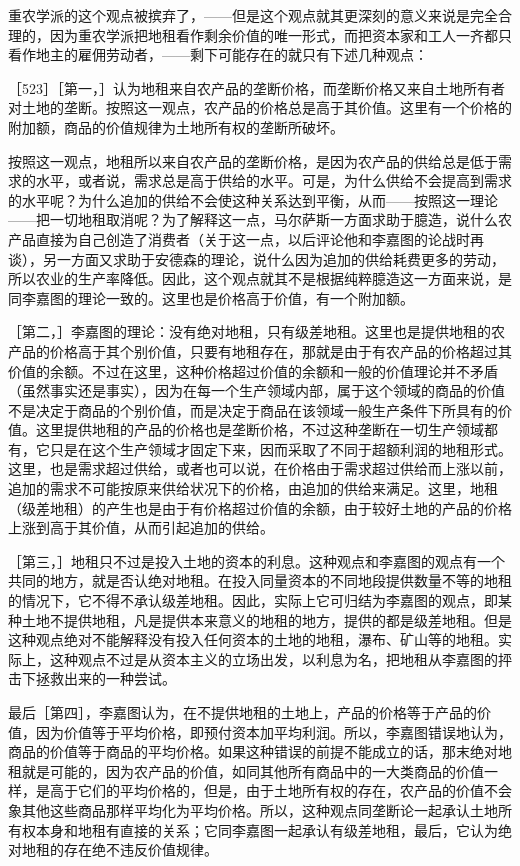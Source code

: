 重农学派的这个观点被摈弃了，——但是这个观点就其更深刻的意义来说是完全合理的，因为重农学派把地租看作剩余价值的唯一形式，而把资本家和工人一齐都只看作地主的雇佣劳动者，——剩下可能存在的就只有下述几种观点：

［523］［第一，］认为地租来自农产品的垄断价格，而垄断价格又来自土地所有者对土地的垄断。按照这一观点，农产品的价格总是高于其价值。这里有一个价格的附加额，商品的价值规律为土地所有权的垄断所破坏。

按照这一观点，地租所以来自农产品的垄断价格，是因为农产品的供给总是低于需求的水平，或者说，需求总是高于供给的水平。可是，为什么供给不会提高到需求的水平呢？为什么追加的供给不会使这种关系达到平衡，从而——按照这一理论——把一切地租取消呢？为了解释这一点，马尔萨斯一方面求助于臆造，说什么农产品直接为自己创造了消费者（关于这一点，以后评论他和李嘉图的论战时再谈），另一方面又求助于安德森的理论，说什么因为追加的供给耗费更多的劳动，所以农业的生产率降低。因此，这个观点就其不是根据纯粹臆造这一方面来说，是同李嘉图的理论一致的。这里也是价格高于价值，有一个附加额。

［第二，］李嘉图的理论：没有绝对地租，只有级差地租。这里也是提供地租的农产品的价格高于其个别价值，只要有地租存在，那就是由于有农产品的价格超过其价值的余额。不过在这里，这种价格超过价值的余额和一般的价值理论并不矛盾（虽然事实还是事实），因为在每一个生产领域内部，属于这个领域的商品的价值不是决定于商品的个别价值，而是决定于商品在该领域一般生产条件下所具有的价值。这里提供地租的产品的价格也是垄断价格，不过这种垄断在一切生产领域都有，它只是在这个生产领域才固定下来，因而采取了不同于超额利润的地租形式。这里，也是需求超过供给，或者也可以说，在价格由于需求超过供给而上涨以前，追加的需求不可能按原来供给状况下的价格，由追加的供给来满足。这里，地租（级差地租）的产生也是由于有价格超过价值的余额，由于较好土地的产品的价格上涨到高于其价值，从而引起追加的供给。

［第三，］地租只不过是投入土地的资本的利息。这种观点和李嘉图的观点有一个共同的地方，就是否认绝对地租。在投入同量资本的不同地段提供数量不等的地租的情况下，它不得不承认级差地租。因此，实际上它可归结为李嘉图的观点，即某种土地不提供地租，凡是提供本来意义的地租的地方，提供的都是级差地租。但是这种观点绝对不能解释没有投入任何资本的土地的地租，瀑布、矿山等的地租。实际上，这种观点不过是从资本主义的立场出发，以利息为名，把地租从李嘉图的抨击下拯救出来的一种尝试。

最后［第四］，李嘉图认为，在不提供地租的土地上，产品的价格等于产品的价值，因为价值等于平均价格，即预付资本加平均利润。所以，李嘉图错误地认为，商品的价值等于商品的平均价格。如果这种错误的前提不能成立的话，那末绝对地租就是可能的，因为农产品的价值，如同其他所有商品中的一大类商品的价值一样，是高于它们的平均价格的，但是，由于土地所有权的存在，农产品的价值不会象其他这些商品那样平均化为平均价格。所以，这种观点同垄断论一起承认土地所有权本身和地租有直接的关系；它同李嘉图一起承认有级差地租，最后，它认为绝对地租的存在绝不违反价值规律。

